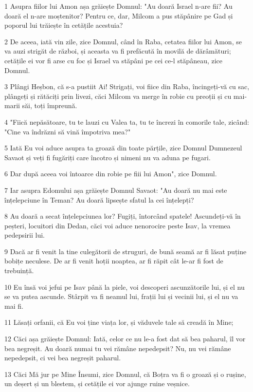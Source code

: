 \par 1 Asupra fiilor lui Amon așa grăiește Domnul: "Au doară Israel n-are fii? Au doară el n-are moștenitor? Pentru ce, dar, Milcom a pus stăpânire pe Gad și poporul lui trăiește în cetățile acestuia?
\par 2 De aceea, iată vin zile, zice Domnul, când în Raba, cetatea fiilor lui Amon, se va auzi strigăt de război, și aceasta va fi prefăcută în movilă de dărâmături; cetățile ei vor fi arse cu foc și Israel va stăpâni pe cei ce-l stăpâneau, zice Domnul.
\par 3 Plângi Heșbon, că s-a pustiit Ai! Strigați, voi fiice din Raba, încingeți-vă cu sac, plângeți și rătăciți prin livezi, căci Milcom va merge în robie cu preoții și cu mai-marii săi, toți împreună.
\par 4 "Fiică nepăsătoare, tu te lauzi cu Valea ta, tu te încrezi în comorile tale, zicând: "Cine va îndrăzni să vină împotriva mea?"
\par 5 Iată Eu voi aduce asupra ta groază din toate părțile, zice Domnul Dumnezeul Savaot și veți fi fugăriți care încotro și nimeni nu va aduna pe fugari.
\par 6 Dar după aceea voi întoarce din robie pe fiii lui Amon", zice Domnul.
\par 7 Iar asupra Edomului așa grăiește Domnul Savaot: "Au doară nu mai este înțelepciune în Teman? Au doară lipsește sfatul la cei înțelepți?
\par 8 Au doară a secat înțelepciunea lor? Fugiți, întorcând spatele! Ascundeți-vă în peșteri, locuitori din Dedan, căci voi aduce nenorocire peste Isav, la vremea pedepsirii lui.
\par 9 Dacă ar fi venit la tine culegătorii de struguri, de bună seamă ar fi lăsat puține bobițe neculese. De ar fi venit hoții noaptea, ar fi răpit cât le-ar fi fost de trebuință.
\par 10 Eu însă voi jefui pe Isav până la piele, voi descoperi ascunzătorile lui, și el nu se va putea ascunde. Stârpit va fi neamul lui, frații lui și vecinii lui, și el nu va mai fi.
\par 11 Lăsați orfanii, că Eu voi ține viața lor, și văduvele tale să creadă în Mine;
\par 12 Căci așa grăiește Domnul: Iată, celor ce nu le-a fost dat să bea paharul, îl vor bea negreșit. Au doară numai tu vei rămâne nepedepsit? Nu, nu vei rămâne nepedepsit, ci vei bea negreșit paharul.
\par 13 Căci Mă jur pe Mine Însumi, zice Domnul, că Boțra va fi o groază și o rușine, un deșert și un blestem, și cetățile ei vor ajunge ruine veșnice.
